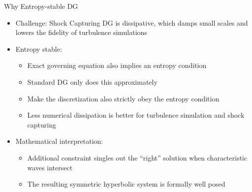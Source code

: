 \def\CC{{C\nolinebreak[4]\hspace{-.05em}\raisebox{.4ex}{\tiny\bf ++}}}
%
\begin{frame}{Why Entropy-stable DG}
	\begin{itemize}
		\setlength{\itemsep}{0.2in}
		\item  Challenge:  Shock Capturing DG is dissipative, which damps small scales and lowers the fidelity of turbulence simulations 
		\item  Entropy stable:
		\begin{itemize}
			\item Exact governing equation also implies an entropy condition
			\item Standard DG only does this approximately
			\item Make the discretization also strictly obey the entropy condition
			\item Less numerical dissipation is better for turbulence simulation and shock capturing
		\end{itemize}
		\item Mathematical interpretation:
		\begin{itemize}
			\item Additional constraint singles out the ``right'' solution when characteristic waves intersect
			\item The resulting symmetric hyperbolic system is formally well posed
		\end{itemize}
	\end{itemize}
\end{frame}

